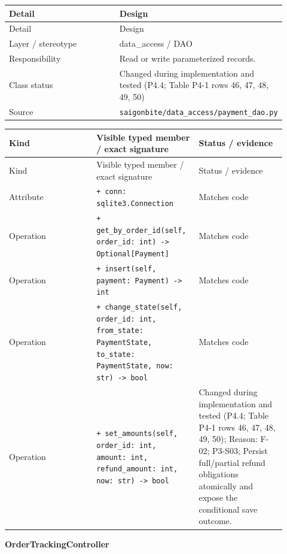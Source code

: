 \begin{longtable}{>{\raggedright\arraybackslash}p{0.4600\linewidth}>{\raggedright\arraybackslash}p{0.4600\linewidth}}
Detail & Design \\
\hline\endfirsthead
Detail & Design \\
\hline\endhead
Layer / stereotype & data\_access / \guillemotleft{}DAO\guillemotright{} \\
Responsibility & Read or write parameterized records. \\
Class status & Changed during implementation and tested (P4.4; Table P4-1 rows 46, 47, 48, 49, 50) \\
Source & \texttt{saigonbite/\allowbreak{}data\_\allowbreak{}access/\allowbreak{}payment\_\allowbreak{}dao.\allowbreak{}py} \\
\end{longtable}
\begin{longtable}{>{\raggedright\arraybackslash}p{0.3067\linewidth}>{\raggedright\arraybackslash}p{0.3067\linewidth}>{\raggedright\arraybackslash}p{0.3067\linewidth}}
Kind & Visible typed member / exact signature & Status / evidence \\
\hline\endfirsthead
Kind & Visible typed member / exact signature & Status / evidence \\
\hline\endhead
Attribute & \texttt{+ conn: sqlite3.\allowbreak{}Connection} & Matches code \\
Operation & \texttt{+ get\_\allowbreak{}by\_\allowbreak{}order\_\allowbreak{}id(self, order\_\allowbreak{}id: int) -\textgreater{} Optional[Payment]} & Matches code \\
Operation & \texttt{+ insert(self, payment: Payment) -\textgreater{} int} & Matches code \\
Operation & \texttt{+ change\_\allowbreak{}state(self, order\_\allowbreak{}id: int, from\_\allowbreak{}state: PaymentState, to\_\allowbreak{}state: PaymentState, now: str) -\textgreater{} bool} & Matches code \\
Operation & \texttt{+ set\_\allowbreak{}amounts(self, order\_\allowbreak{}id: int, amount: int, refund\_\allowbreak{}amount: int, now: str) -\textgreater{} bool} & Changed during implementation and tested (P4.4; Table P4-1 rows 46, 47, 48, 49, 50); Reason: F-02; P3-S03; Persist full/partial refund obligations atomically and expose the conditional save outcome. \\
\end{longtable}
\textbf{OrderTrackingController}

